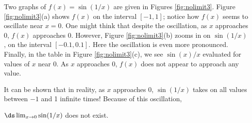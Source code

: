 
%
{%
Two graphs of $f(x) = \sin(1/x)$ are given in Figures \ref{fig:nolimit3}. Figure \ref{fig:nolimit3}(a) shows $f(x)$ on the interval $[-1,1]$; notice how $f(x)$ seems to oscillate near $x=0$. One might think that despite the oscillation, as $x$ approaches 0, $f(x)$ approaches 0. However, Figure \ref{fig:nolimit3}(b) zooms in on $\sin(1/x)$, on the interval $[-0.1,0.1]$. Here the oscillation is even more pronounced. Finally, in the table in Figure \ref{fig:nolimit3}(c), we see $\sin(x)/x$ evaluated for values of $x$ near 0. As $x$ approaches 0, $f(x)$ does not appear to approach any value. 

It can be shown that in reality, as $x$ approaches 0, $\sin(1/x)$ takes on all values between $-1$ and 1 infinite times! Because of this oscillation,

 $\ds\lim_{x\to 0}\sin(1/x)$ does not exist.}\\


